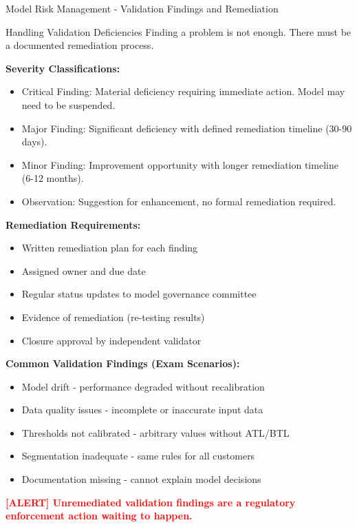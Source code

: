 \documentclass[11pt,a4paper]{beamer}
\newcommand{\redflag}[1]{\textcolor{red}{\textbf{[ALERT] #1}}}
\begin{document}
	\begin{frame}{Model Risk Management - Validation Findings and Remediation}
		\begin{block}{Handling Validation Deficiencies}
			Finding a problem is not enough. There must be a documented remediation process.
		\end{block}
		
		\textbf{Severity Classifications:}
		\begin{itemize}
			\item Critical Finding: Material deficiency requiring immediate action. Model may need to be suspended.
			\item Major Finding: Significant deficiency with defined remediation timeline (30-90 days).
			\item Minor Finding: Improvement opportunity with longer remediation timeline (6-12 months).
			\item Observation: Suggestion for enhancement, no formal remediation required.
		\end{itemize}
		
		\textbf{Remediation Requirements:}
		\begin{itemize}
			\item Written remediation plan for each finding
			\item Assigned owner and due date
			\item Regular status updates to model governance committee
			\item Evidence of remediation (re-testing results)
			\item Closure approval by independent validator
		\end{itemize}
		
		\textbf{Common Validation Findings (Exam Scenarios):}
		\begin{itemize}
			\item Model drift - performance degraded without recalibration
			\item Data quality issues - incomplete or inaccurate input data
			\item Thresholds not calibrated - arbitrary values without ATL/BTL
			\item Segmentation inadequate - same rules for all customers
			\item Documentation missing - cannot explain model decisions
		\end{itemize}
		
		\redflag{Unremediated validation findings are a regulatory enforcement action waiting to happen.}
	\end{frame}
	
\end{document}
